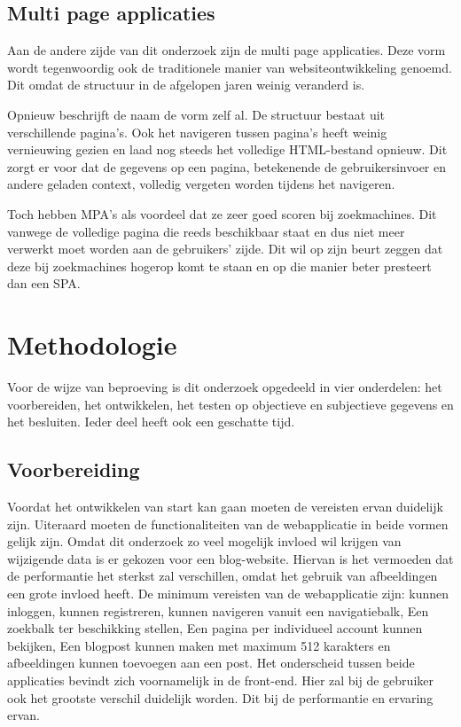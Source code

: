 \documentclass{hogent-article}
\begin{document}
\subsection{Multi page applicaties}
Aan de andere zijde van dit onderzoek zijn de multi page applicaties.
Deze vorm wordt tegenwoordig ook de traditionele manier van websiteontwikkeling genoemd.
Dit omdat de structuur in de afgelopen jaren weinig veranderd is.

Opnieuw beschrijft de naam de vorm zelf al.
De structuur bestaat uit verschillende pagina's.
Ook het navigeren tussen pagina's heeft weinig vernieuwing gezien en laad nog steeds het volledige HTML-bestand opnieuw.
Dit zorgt er voor dat de gegevens op een pagina, betekenende de gebruikersinvoer en andere geladen context, volledig vergeten worden tijdens het navigeren.

Toch hebben MPA's als voordeel dat ze zeer goed scoren bij zoekmachines.
Dit vanwege de volledige pagina die reeds beschikbaar staat en dus niet meer verwerkt moet worden aan de gebruikers' zijde.
Dit wil op zijn beurt zeggen dat deze bij zoekmachines hogerop komt te staan en op die manier beter presteert dan een SPA.


\section{Methodologie}
Voor de wijze van beproeving is dit onderzoek opgedeeld in vier onderdelen: het voorbereiden, het ontwikkelen, het testen op objectieve en subjectieve gegevens en het besluiten.
Ieder deel heeft ook een geschatte tijd.

\subsection{Voorbereiding}
Voordat het ontwikkelen van start kan gaan moeten de vereisten ervan duidelijk zijn.
Uiteraard moeten de functionaliteiten van de webapplicatie in beide vormen gelijk zijn.
Omdat dit onderzoek zo veel mogelijk invloed wil krijgen van wijzigende data is er gekozen voor een blog-website.
Hiervan is het vermoeden dat de performantie het sterkst zal verschillen, omdat het gebruik van afbeeldingen een grote invloed heeft.
De minimum vereisten van de webapplicatie zijn:
kunnen inloggen,
kunnen registreren,
kunnen navigeren vanuit een navigatiebalk,
Een zoekbalk ter beschikking stellen,
Een pagina per individueel account kunnen bekijken,
Een blogpost kunnen maken met maximum 512 karakters
en afbeeldingen kunnen toevoegen aan een post.
Het onderscheid tussen beide applicaties bevindt zich voornamelijk in de front-end.
Hier zal bij de gebruiker ook het grootste verschil duidelijk worden.
Dit bij de performantie en ervaring ervan.
\end{document}
